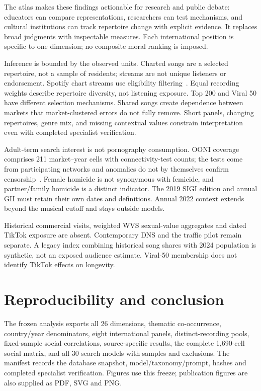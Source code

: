 \documentclass[10pt,a4paper,twocolumn]{article}
\begin{document}
The atlas makes these findings actionable for research and public debate: educators can compare representations, researchers can test mechanisms, and cultural institutions can track repertoire change with explicit evidence. It replaces broad judgments with inspectable measures. Each international position is specific to one dimension; no composite moral ranking is imposed.

Inference is bounded by the observed units. Charted songs are a selected repertoire, not a sample of residents; streams are not unique listeners or endorsement. Spotify chart streams use eligibility filtering~\cite{spotify}. Equal recording weights describe repertoire diversity, not listening exposure. Top 200 and Viral 50 have different selection mechanisms. Shared songs create dependence between markets that market-clustered errors do not fully remove. Short panels, changing repertoires, genre mix, and missing contextual values constrain interpretation even with completed specialist verification.

Adult-term search interest is not pornography consumption. OONI coverage comprises 211 market--year cells with connectivity-test counts; the tests come from participating networks and anomalies do not by themselves confirm censorship~\cite{ooni}. Female homicide is not synonymous with femicide, and partner/family homicide is a distinct indicator. The 2019 SIGI edition and annual GII must retain their own dates and definitions. Annual 2022 context extends beyond the musical cutoff and stays outside models.

Historical commercial visits, weighted WVS sexual-value aggregates and dated TikTok exposure are absent. Contemporary DNS and the traffic pilot remain separate. A legacy index combining historical song shares with 2024 population is synthetic, not an exposed audience estimate. Viral-50 membership does not identify TikTok effects on longevity.

\section{Reproducibility and conclusion}
The frozen analysis exports all 26 dimensions, thematic co-occurrence, country/year denominators, eight international panels, distinct-recording pools, fixed-sample social correlations, source-specific results, the complete 1,690-cell social matrix, and all 30 search models with samples and exclusions. The manifest records the database snapshot, model/taxonomy/prompt, hashes and completed specialist verification. Figures use this freeze; publication figures are also supplied as PDF, SVG and PNG.
\end{document}
